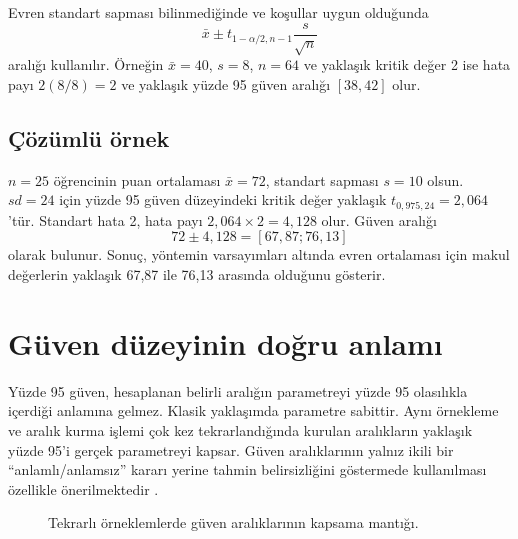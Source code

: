 Evren standart sapması bilinmediğinde ve koşullar uygun olduğunda
\[
\bar x\pm t_{1-\alpha/2,n-1}\frac{s}{\sqrt n}
\]
aralığı kullanılır. Örneğin $\bar x=40$, $s=8$, $n=64$ ve yaklaşık kritik
değer 2 ise hata payı $2(8/8)=2$ ve yaklaşık yüzde 95 güven aralığı
$[38,42]$ olur.

\subsection{Çözümlü örnek}

$n=25$ öğrencinin puan ortalaması $\bar x=72$, standart sapması $s=10$
olsun. $sd=24$ için yüzde 95 güven düzeyindeki kritik değer yaklaşık
$t_{0{,}975,24}=2{,}064$'tür. Standart hata 2, hata payı
$2{,}064\times2=4{,}128$ olur. Güven aralığı
\[
72\pm4{,}128=[67{,}87;76{,}13]
\]
olarak bulunur. Sonuç, yöntemin varsayımları altında evren ortalaması için
makul değerlerin yaklaşık 67,87 ile 76,13 arasında olduğunu gösterir.

\section{Güven düzeyinin doğru anlamı}
\label{sec:ci-interpretation}

Yüzde 95 güven, hesaplanan belirli aralığın parametreyi yüzde 95 olasılıkla
içerdiği anlamına gelmez. Klasik yaklaşımda parametre sabittir. Aynı örnekleme
ve aralık kurma işlemi çok kez tekrarlandığında kurulan aralıkların yaklaşık
yüzde 95'i gerçek parametreyi kapsar. Güven aralıklarının yalnız ikili bir
``anlamlı/anlamsız'' kararı yerine tahmin belirsizliğini göstermede
kullanılması özellikle önerilmektedir \citep{cumming2014,appelbaum2018}.

\begin{figure}[H]
\centering
{}
\caption{Tekrarlı örneklemlerde güven aralıklarının kapsama mantığı.}
\label{fig:ci-coverage}
\end{figure}

